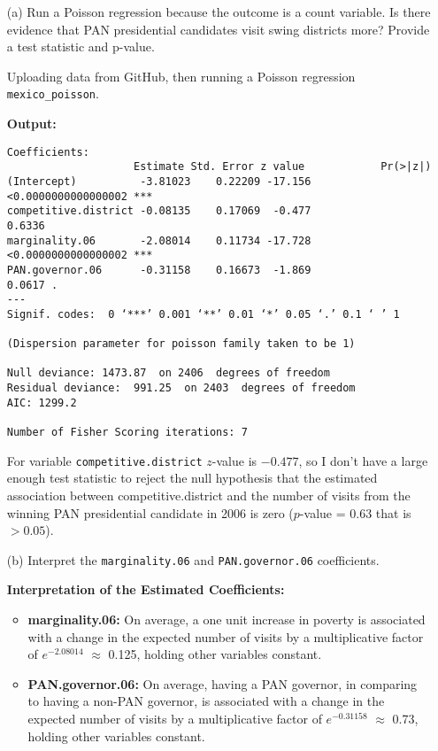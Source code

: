 \documentclass[12pt,letterpaper]{article}
\begin{document}
\begin{enumerate}
	\item [(a)]
	Run a Poisson regression because the outcome is a count variable. Is there evidence that PAN presidential candidates visit swing districts more? Provide a test statistic and p-value.
	
	\noindent  Uploading data from GitHub, then running a Poisson regression \texttt{mexico\_poisson}. 
	 
	\noindent \textbf{Output:}
	
	\begin{footnotesize}
		\begin{verbatim}
Coefficients:                     
                    Estimate Std. Error z value            Pr(>|z|)    
(Intercept)          -3.81023    0.22209 -17.156 <0.0000000000000002 ***
competitive.district -0.08135    0.17069  -0.477              0.6336    
marginality.06       -2.08014    0.11734 -17.728 <0.0000000000000002 ***
PAN.governor.06      -0.31158    0.16673  -1.869              0.0617 .  
---
Signif. codes:  0 ‘***’ 0.001 ‘**’ 0.01 ‘*’ 0.05 ‘.’ 0.1 ‘ ’ 1

(Dispersion parameter for poisson family taken to be 1)    

Null deviance: 1473.87  on 2406  degrees of freedom
Residual deviance:  991.25  on 2403  degrees of freedom
AIC: 1299.2

Number of Fisher Scoring iterations: 7		
		\end{verbatim}  
	\end{footnotesize}

\noindent  For variable \texttt{competitive.district} \(z\)-value is \(-0.477\), so I don't have a large enough test statistic to reject the null hypothesis that the estimated association between competitive.district and the number of visits from the winning PAN presidential candidate in 2006 is zero (\(p\)-value = 0.63 that is \(> 0.05\)).

	\item [(b)]
	Interpret the \texttt{marginality.06} and \texttt{PAN.governor.06} coefficients.
	
	\textbf{Interpretation of the Estimated Coefficients:}
	
	\begin{itemize}
		\item \textbf{marginality.06:} On average, a one unit increase in poverty is associated with a change in the expected number of visits by a multiplicative factor of \(e^{-2.08014}\) $\approx$ 0.125, holding other variables constant.
		\item \textbf{PAN.governor.06:} On average, having a PAN governor, in comparing to having a non-PAN governor, is associated with a change in the expected number of visits by a multiplicative factor of \(e^{-0.31158}\) $\approx $ 0.73, holding other variables constant.
	\end{itemize}
	

\end{enumerate}
\end{document}
